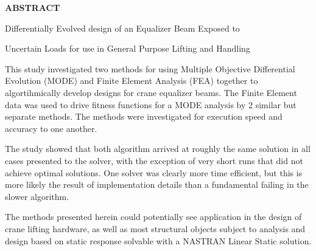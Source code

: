 {\LARGE\center
  \textbf{\uppercase{Abstract}}\par
}

{\Large{ {\centerline{Differentially Evolved design of an Equalizer Beam Exposed to}}}}
{\Large{ {\centerline{Uncertain Loads for use in General Purpose Lifting and Handling}}}}

\vspace{1cm}

This study investigated two methods for using Multiple Objective Differential Evolution (MODE) and Finite Element Analysis (FEA) together to algortihmically develop designs for crane equalizer beams. The Finite Element data was used to drive fitness functions for a MODE analysis by 2 similar but separate methods. The methods were investigated for execution speed and accuracy to one another. 

The study showed that both algorithm arrived at roughly the same solution in all cases presented to the solver, with the exception of very short runs that did not achieve optimal solutions. One solver was clearly more time efficient, but this is more likely the result of implementation details than a fundamental failing in the slower algorithm. 

The methods presented herein could potentially see application in the design of crane lifting hardware, as well as most structural objects subject to analysis and design based on static response solvable with a NASTRAN Linear Static solution. 

